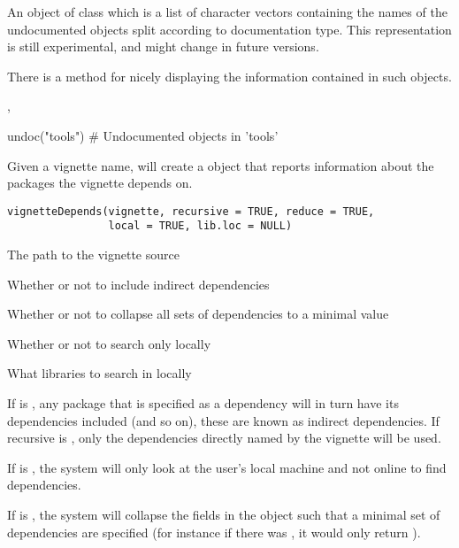 %
\begin{Value}
An object of class  which is a list of character vectors
containing the names of the undocumented objects split according to
documentation type.  This representation is still experimental, and
might change in future versions.

There is a  method for nicely displaying the information
contained in such objects.
\end{Value}
%
\begin{SeeAlso}\relax
{}, 
\end{SeeAlso}
%
\begin{Examples}
\begin{ExampleCode}
undoc("tools")                  # Undocumented objects in 'tools'
\end{ExampleCode}
\end{Examples}
%
\begin{Description}\relax
Given a vignette name, will create a  object that
reports information about the packages the vignette depends on.
\end{Description}
%
\begin{Usage}
\begin{verbatim}
vignetteDepends(vignette, recursive = TRUE, reduce = TRUE,
                local = TRUE, lib.loc = NULL)
\end{verbatim}
\end{Usage}
%
\begin{Arguments}
\begin{ldescription}
\item[\code{vignette}] The path to the vignette source
\item[\code{recursive}] Whether or not to include indirect dependencies
\item[\code{reduce}] Whether or not to collapse all sets of dependencies to a
minimal value
\item[\code{local}] Whether or not to search only locally
\item[\code{lib.loc}] What libraries to search in locally
\end{ldescription}
\end{Arguments}
%
\begin{Details}\relax
If  is , any package that is specified as a
dependency will in turn have its dependencies included (and so on),
these are known as indirect dependencies.  If recursive is
, only the dependencies directly named by the vignette
will be used.

If  is , the system will only look at the
user's local machine and not online to find dependencies.

If  is , the system will collapse the fields in the
 object such that a minimal set of dependencies
are specified (for instance if there was
, it would only return
).
\end{Details}

